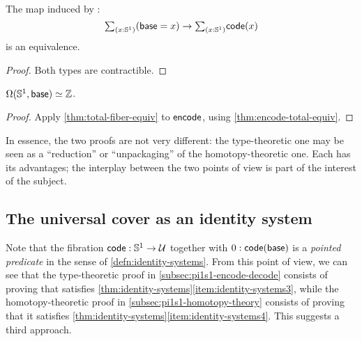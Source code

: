 \begin{cor}\label{thm:encode-total-equiv}
  The map induced by \encode:
  \[ \tsm{x:\Sn^1} (\base=x) \to \tsm{x:\Sn^1}\code(x) \]
  is an equivalence.
\end{cor}
\begin{proof}
  Both types are contractible.
\end{proof}

\begin{thm}
  $\Omega(\mathbb{S}^1,\mathsf{base}) \simeq \mathbb{Z}$.
\end{thm}
\begin{proof}
  Apply \autoref{thm:total-fiber-equiv} to $\mathsf{encode}$, using \autoref{thm:encode-total-equiv}.
\end{proof}

In essence, the two proofs are not very different: the type-theoretic one may be seen as a ``reduction'' or ``unpackaging'' of the homotopy-theoretic one.
Each has its advantages; the interplay between the two points of view is part of the interest of the subject.

\subsection{The universal cover as an identity system}
\label{sec:pi1s1-idsys}

Note that the fibration $\mathsf{code}:\mathbb{S}^1\to\mathcal{U}$ together with $0:\mathsf{code}(\mathsf{base})$ is a \emph{pointed predicate} in the sense of \autoref{defn:identity-systems}.
From this point of view, we can see that the type-theoretic proof in \autoref{subsec:pi1s1-encode-decode} consists of proving that \code satisfies \autoref{thm:identity-systems}\ref{item:identity-systems3}, while the homotopy-theoretic proof in \autoref{subsec:pi1s1-homotopy-theory} consists of proving that it satisfies \autoref{thm:identity-systems}\ref{item:identity-systems4}.
This suggests a third approach.

